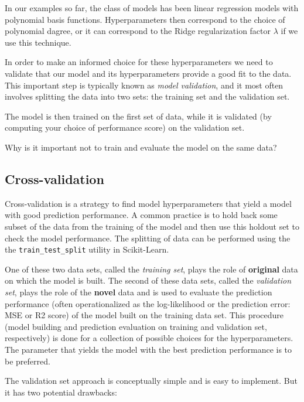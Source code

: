 \documentclass[%
oneside,                 %
final,                   %
10pt]{article}
\newenvironment{question_mdfboxadmon}[1][]{
\begin{question_mdfboxmdframed}[frametitle=#1]
}
{
\end{question_mdfboxmdframed}
}
\begin{document}
\noindent
In our examples so far, the class of models has been linear regression models with polynomial basis functions. Hyperparameters then correspond to the choice of polynomial dagree, or it can correspond to the Ridge regularization factor $\lambda$ if we use this technique. 

In order to make an informed choice for these hyperparameters we need to validate that our model and its hyperparameters provide a good fit to the data. This important step is typically known as \emph{model validation}, and it most often involves splitting the data into two sets: the training set and the validation set. 

The model is then trained on the first set of data, while it is validated (by computing your choice of performance score) on the validation set.


\begin{question_mdfboxadmon}[Question]
Why is it important not to train and evaluate the model on the same data?
\end{question_mdfboxadmon} %




\subsection{Cross-validation}

Cross-validation is a strategy to find model hyperparameters that yield a model with good prediction
performance. A common practice is to hold back some subset of the data from the training of the model and then use this holdout set to check the model performance. The splitting of data can be performed using the the \Verb!train_test_split! utility in Scikit-Learn.

One of these two data sets, called the 
\emph{training set}, plays the role of \textbf{original} data on which the model is
built. The second of these data sets, called the \emph{validation set}, plays the
role of the \textbf{novel} data and is used to evaluate the prediction
performance (often operationalized as the log-likelihood or the
prediction error: MSE or R2 score) of the model built on the training data set. This
procedure (model building and prediction evaluation on training and
validation set, respectively) is done for a collection of possible choices for the hyperparameters. The parameter that yields the model with
the best prediction performance is to be preferred. 

The validation set approach is conceptually simple and is easy to implement. But it has two potential drawbacks:
\end{document}
